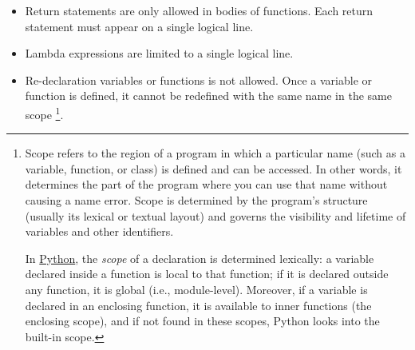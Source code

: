 \begin{itemize}
\item Return statements are only allowed in bodies of functions. Each return statement must appear on a single logical line.
\item Lambda expressions are limited to a single logical line.
\item Re-declaration variables or functions is not allowed. Once a variable or function is defined, it cannot be redefined with the same name in the same scope
\footnote{
Scope refers to the region of a program in which a particular name (such as a variable, function, or class) is defined and can be accessed. In other words, 
it determines the part of the program where you can use that name without causing a name error. 
Scope is determined by the program's structure (usually its lexical or textual layout) and governs the visibility and lifetime of variables and other identifiers.

In \href{https://docs.python.org/3/tutorial/classes.html\#python-scopes-and-namespaces}{\color{DarkBlue}Python}, the \emph{scope} of a declaration is determined lexically: a variable declared inside a function is local to that function; 
if it is declared outside any function, it is global (i.e., module-level). Moreover, if a variable is declared in an enclosing function, 
it is available to inner functions (the enclosing scope), and if not found in these scopes, Python looks into the built-in scope.
}.
\end{itemize}


